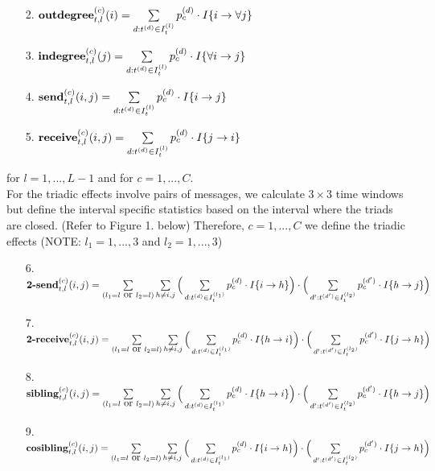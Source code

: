 \documentclass[a4paper]{article}
\begin{document}
 \begin{itemize}
 	 	 \item [2.]  $\mbox{\textbf{outdegree}}^{(c)}_{t, l}(i)=\sum\limits_{d: t^{(d)} \in I_{t}^{(l)}}p_c^{(d)}\cdot I\{i\rightarrow \forall j\}$
 	 	 \item [3.] $\mbox{\textbf{indegree}}^{(c)}_{t, l}(j)=\sum\limits_{d: t^{(d)} \in I_{t}^{(l)}}p_c^{(d)}\cdot I\{\forall i \rightarrow j\}$	 	 	
 	 	 \item [4.]  $\mbox{\textbf{send}}^{(c)}_{t, l}(i, j)=\sum\limits_{d: t^{(d)} \in I_{t}^{(l)}}p_c^{(d)}\cdot I\{i\rightarrow j\}$
 	\item [5.] $\mbox{\textbf{receive}}^{(c)}_{t, l}(i, j)=\sum\limits_{d: t^{(d)} \in I_{t}^{(l)}}p_c^{(d)}\cdot I\{j\rightarrow i\}$
 \end{itemize}
for $l=1,...,L-1$ and for $c = 1,...,C$. \\ \newline For the triadic effects involve pairs of messages, we calculate $3 \times 3$ time windows but define the interval specific statistics based on the interval where the triads are closed. (Refer to Figure 1. below) Therefore, $c=1,...,C$ we define the triadic effects (NOTE: $l_1 = 1,...,3$ and $l_2 = 1,...,3$)
\begin{itemize}
	 	\item [6.] $\mbox{\textbf{2-send}}^{(c)}_{t, l}(i, j)=\sum\limits_{\substack{(l_1= l \mbox { or }  l_2 = l)} }\sum\limits_{h \neq i, j}\Big(\sum\limits_{d: t^{(d)} \in I_{t}^{(l_1)}}p_c^{(d)}\cdot I\{i\rightarrow h\}\Big)\cdot \Big(\sum\limits_{d': t^{(d')} \in I_{t}^{( l_2)}}p_c^{(d')}\cdot I\{h\rightarrow j\}\Big)$
 	\item [7.] $\mbox{\textbf{2-receive}}^{(c)}_{t, l}(i, j)=\sum\limits_{\substack{(l_1= l \mbox { or }  l_2 = l)} }\sum\limits_{h \neq i, j}\Big(\sum\limits_{d: t^{(d)} \in I_t^{(l_1)}}p_c^{(d)}\cdot I\{h\rightarrow i\}\Big)\cdot \Big(\sum\limits_{d': t^{(d')} \in I_t^{(l_2)}}p_c^{(d')}\cdot I\{j\rightarrow h\}\Big)$
 	\item [8.] $\mbox{\textbf{sibling}}^{(c)}_{t, l}(i, j)=\sum\limits_{\substack{(l_1= l \mbox { or }  l_2 = l)} }\sum\limits_{h \neq i, j}\Big(\sum\limits_{d: t^{(d)} \in I_t^{(l_1)}}p_c^{(d)}\cdot I\{h\rightarrow i\}\Big)\cdot \Big(\sum\limits_{d': t^{(d')} \in I_t^{(l_2)}}p_c^{(d')}\cdot I\{h\rightarrow j\}\Big)$
 	\item [9.] $\mbox{\textbf{cosibling}}^{(c)}_{t, l}(i, j)=\sum\limits_{\substack{(l_1= l \mbox { or }  l_2 = l)} }\sum\limits_{h \neq i, j}\Big(\sum\limits_{d: t^{(d)} \in I_t^{(l_1)}}p_c^{(d)}\cdot I\{i\rightarrow h\}\Big)\cdot \Big(\sum\limits_{d': t^{(d')} \in I_t^{(l_2)}}p_c^{(d')}\cdot I\{j\rightarrow h\}\Big)$
 \end{itemize}
\end{document}
